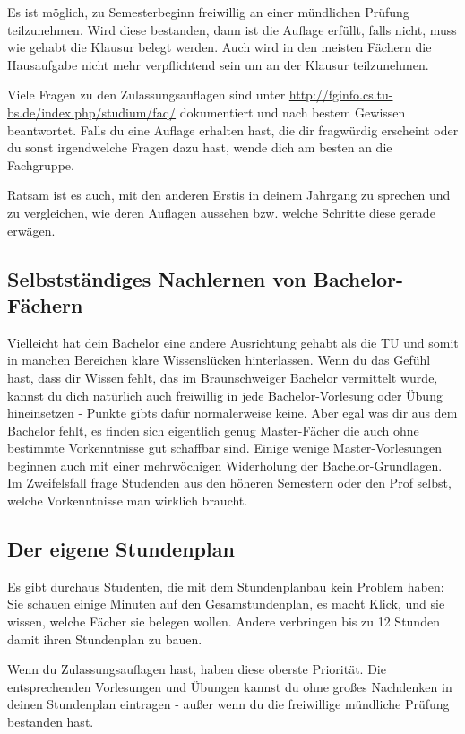 \begin{multicols}{2}
	Es ist möglich, zu Semesterbeginn freiwillig an einer mündlichen Prüfung teilzunehmen. Wird diese bestanden, dann ist die Auflage erfüllt, falls nicht, muss wie gehabt die Klausur belegt werden. Auch wird in den meisten Fächern die Hausaufgabe nicht mehr verpflichtend sein um an der Klausur teilzunehmen.

	Viele Fragen zu den Zulassungsauflagen sind unter \url{http://fginfo.cs.tu-bs.de/index.php/studium/faq/} dokumentiert und nach bestem Gewissen beantwortet. Falls du eine Auflage erhalten hast, die dir fragwürdig erscheint oder du sonst irgendwelche Fragen dazu hast, wende dich am besten an die Fachgruppe.

	Ratsam ist es auch, mit den anderen Erstis in deinem Jahrgang zu sprechen und zu vergleichen, wie deren Auflagen aussehen bzw. welche Schritte diese gerade erwägen. 

	\subsection{Selbstständiges Nachlernen von Bachelor-Fächern}
		Vielleicht hat dein Bachelor eine andere Ausrichtung gehabt als die TU und somit in manchen Bereichen klare Wissenslücken hinterlassen. Wenn du das Gefühl hast, dass dir Wissen fehlt, das im Braunschweiger Bachelor vermittelt wurde, kannst du dich natürlich auch freiwillig in jede Bachelor-Vorlesung oder Übung hineinsetzen - Punkte gibts dafür normalerweise keine. Aber egal was dir aus dem Bachelor fehlt, es finden sich eigentlich genug Master-Fächer die auch ohne bestimmte Vorkenntnisse gut schaffbar sind. Einige wenige Master-Vorlesungen beginnen auch mit einer mehrwöchigen Widerholung der Bachelor-Grundlagen. Im Zweifelsfall frage Studenden aus den höheren Semestern oder den Prof selbst, welche Vorkenntnisse man wirklich braucht.

	\subsection{Der eigene Stundenplan}
		\label{masterstundenplan}
		Es gibt durchaus Studenten, die mit dem Stundenplanbau kein Problem haben: Sie schauen einige Minuten auf den Gesamstundenplan, es macht Klick, und sie wissen, welche Fächer sie belegen wollen. Andere verbringen bis zu 12 Stunden damit ihren Stundenplan zu bauen.

		Wenn du Zulassungsauflagen hast, haben diese oberste Priorität. Die entsprechenden Vorlesungen und Übungen kannst du ohne großes Nachdenken in deinen Stundenplan eintragen - außer wenn du die freiwillige mündliche Prüfung bestanden hast.


\end{multicols}
